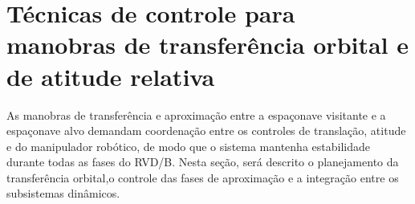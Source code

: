 \section{Técnicas de controle para manobras de transferência orbital e de atitude relativa}
\label{sec:tecnicas_controle_transferencia}

As manobras de transferência e aproximação entre a espaçonave visitante e a espaçonave alvo demandam coordenação entre os controles de translação, atitude e do manipulador robótico, de modo que o sistema mantenha estabilidade durante todas as fases do RVD/B.  
Nesta seção, será descrito o planejamento da transferência orbital,o controle das fases de aproximação e a integração entre os subsistemas dinâmicos.





